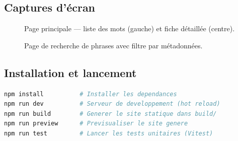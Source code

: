 \subsection{Captures d'écran}

\begin{figure}[ht]
  \centering
  \caption{Page principale --- liste des mots (gauche) et fiche détaillée (centre).}
  \label{fig:main}
\end{figure}

\begin{figure}[ht]
  \centering
  \caption{Page de recherche de phrases avec filtre par métadonnées.}
  \label{fig:phrases}
\end{figure}

\subsection{Installation et lancement}

\begin{lstlisting}[language=bash, title=Commandes de base]
npm install          # Installer les dependances
npm run dev          # Serveur de developpement (hot reload)
npm run build        # Generer le site statique dans build/
npm run preview      # Previsualiser le site genere
npm run test         # Lancer les tests unitaires (Vitest)
\end{lstlisting}
